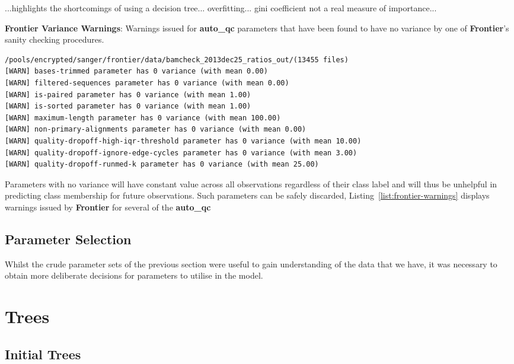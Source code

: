 ...highlights the shortcomings of using a decision tree...
overfitting... gini coefficient not a real measure of importance...

\begin{listing}[H]
    \caption[frontier-warnings]{\textbf{Frontier Variance Warnings}:
        Warnings issued for \textbf{auto\_qc} parameters that have been found to
        have no variance by one of \textbf{Frontier}'s sanity checking procedures.}
    \label{list:frontier-warnings}
    \begin{verbatim}
/pools/encrypted/sanger/frontier/data/bamcheck_2013dec25_ratios_out/(13455 files)
[WARN] bases-trimmed parameter has 0 variance (with mean 0.00)
[WARN] filtered-sequences parameter has 0 variance (with mean 0.00)
[WARN] is-paired parameter has 0 variance (with mean 1.00)
[WARN] is-sorted parameter has 0 variance (with mean 1.00)
[WARN] maximum-length parameter has 0 variance (with mean 100.00)
[WARN] non-primary-alignments parameter has 0 variance (with mean 0.00)
[WARN] quality-dropoff-high-iqr-threshold parameter has 0 variance (with mean 10.00)
[WARN] quality-dropoff-ignore-edge-cycles parameter has 0 variance (with mean 3.00)
[WARN] quality-dropoff-runmed-k parameter has 0 variance (with mean 25.00)
    \end{verbatim}
\end{listing}

Parameters with no variance will have constant value across all observations
regardless of their class label and will thus be unhelpful in predicting class
membership for future observations. Such parameters can be safely discarded,
Listing~\ref{list:frontier-warnings} displays warnings issued by
\textbf{Frontier} for several of the \textbf{auto\_qc}
\subsection{Parameter Selection}

Whilst the crude parameter sets of the previous section were useful to gain
understanding of the data that we have, it was necessary to obtain more
deliberate decisions for parameters to utilise in the model.

\section{Trees}
\subsection{Initial Trees}

